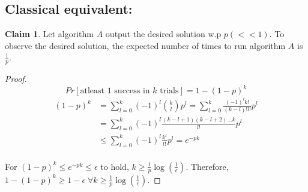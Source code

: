 \documentclass[11.5pt, paper=a4]{article}
\theoremstyle{definition}
\newtheorem{claim}{Claim}
\numberwithin{theorem}{section}
\begin{document}
\subsection{Classical equivalent:}

\begin{claim}
Let algorithm $A$ output the desired solution w.p $p(<<1)$. To observe the desired solution, the expected number of times to run algorithm $A$ is $\frac{1}{p}$.
\end{claim}
\begin{proof}
\begin{equation*}
    Pr[\text{atleast 1 success in $k$ trials}] = 1 - (1-p)^k
\end{equation*}
\begin{equation*}
\begin{split}
    (1-p)^k & = \sum_{l=0}^{k}(-1)^l{k\choose l}p^l = \sum_{l=0}^{k}\frac{(-1)^lk!}{(k-l)!l!}p^l\\
    & = \sum_{l=0}^{k}(-1)^l\frac{(k-l+1)(k-l+2)\hdots k}{l!}p^l\\
    & \le \sum_{l=0}^{k}(-1)^l\frac{k^l}{l!}p^l = e^{-pk}\\
\end{split}
\end{equation*}

For $(1-p)^k \le e^{-pk} \le \epsilon$ to hold, $k \ge \frac{1}{p}\log(\frac{1}{\epsilon})$. Therefore, $1-(1-p)^k \ge 1-\epsilon \; \forall k \ge \frac{1}{p}\log(\frac{1}{\epsilon})$.
\end{proof}



\end{document}
